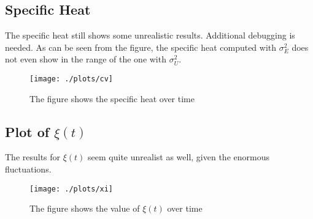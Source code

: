 \documentclass[aps,pra,reprint, onecolumn, rmp]{revtex4-2}
\begin{document}
\subsection{Specific Heat}
The specific heat still shows some unrealistic results. Additional debugging is needed. As can be seen from the figure, the specific heat computed with $\sigma_E^2$ does not even show in the range of the one with $\sigma_U^2$. 
\begin{figure}[h]
          \centering
          \texttt{[image: ./plots/cv]}
          \caption{The figure shows the specific heat over time}
\end{figure}



\subsection{Plot of $\xi(t)$}
The results for $\xi(t)$ seem quite unrealist as well, given the enormous fluctuations.
\begin{figure}[h]
          \centering
          \texttt{[image: ./plots/xi]}
          \caption{The figure shows the value of $\xi(t)$ over time}
\end{figure}
\end{document}
